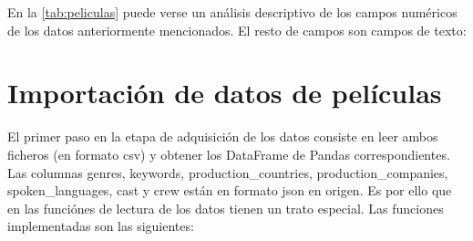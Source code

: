 En la \autoref{tab:peliculas} puede verse un análisis descriptivo de los campos numéricos de los datos anteriormente mencionados. El resto de campos son campos de texto:

\begin{table}[h]
\centering
{}
\caption{Análisis descriptivo de las variables numéricas de los datos de entrada. Se muestra para cada campo el número de filas informadas, la media, la desviación estandar y los cuartiles.}
\label{tab:peliculas}
\end{table}

\newpage
\section{Importación de datos de películas}

El primer paso en la etapa de adquisición de los datos consiste en leer ambos ficheros (en formato csv) y obtener los DataFrame de Pandas correspondientes. Las columnas genres, keywords, production\_countries, production\_companies, spoken\_languages, cast y crew están en formato json en origen. Es por ello que en las funciónes de lectura de los datos tienen un trato especial. Las funciones implementadas son las siguientes:

